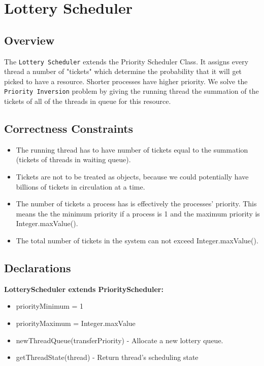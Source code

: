 \section{Lottery Scheduler}

\subsection{Overview}
The \texttt{Lottery Scheduler} extends the Priority Scheduler Class. It assigns every thread a number of "tickets" which determine the probability that it will get picked to have a resource. Shorter processes have higher priority. We solve the \texttt{Priority Inversion} problem by giving the running thread the summation of the tickets of all of the threads in queue for this resource.

\subsection{Correctness Constraints}

\begin{itemize}

\item The running thread has to have number of tickets equal to the summation (tickets of threads in waiting queue).
\item Tickets are not to be treated as objects, because we could potentially have billions of tickets in circulation at a time.
\item The number of tickets a process has is effectively the processes' priority. This means the the minimum priority if a process is 1 and the maximum priority is Integer.maxValue().
\item The total number of tickets in the system can not exceed Integer.maxValue().
\end{itemize}

\subsection{Declarations}

\textbf{LotteryScheduler extends PriorityScheduler:}\begin{itemize}

\item {\ttfamily priorityMinimum = 1}
\item {\ttfamily priorityMaximum = Integer.maxValue}
\item {\ttfamily newThreadQueue(transferPriority)} - Allocate a new lottery queue.
\item {\ttfamily getThreadState(thread)} - Return thread's scheduling state
\end{itemize}

